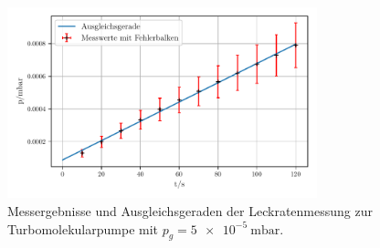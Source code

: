     \begin{figure}
        \centering
        \includegraphics[width=0.8\textwidth]{abb/turbo_leck5e-5.pdf}
        \caption{Messergebnisse und Ausgleichsgeraden der Leckratenmessung zur Turbomolekularpumpe mit $p_g = \qty{5e-5}{\milli\bar}$.}
        \label{fig:turboLeck5}
    \end{figure}


